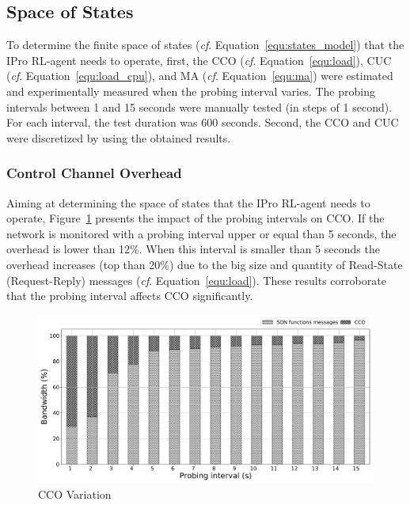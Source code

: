 \subsection{Space of States}
\label{subsec:space_states}

To determine the finite space of states (\textit{cf}. Equation~\ref{equ:states_model}) that the IPro RL-agent needs to operate, first, the CCO (\textit{cf}. Equation~\ref{equ:load}), CUC (\textit{cf}. Equation~\ref{equ:load_cpu}), and MA (\textit{cf}. Equation~\ref{equ:ma}) were estimated and experimentally measured when the probing interval varies. The probing intervals between 1 and 15 seconds were manually tested (in steps of 1 second). For each interval, the test duration was 600 seconds. Second, the CCO and CUC were discretized by using the obtained results.

\subsubsection{Control Channel Overhead}
Aiming at determining the space of states that the IPro RL-agent needs to operate, Figure~\ref{fig:control_channel_load_behavior} presents the impact of the probing intervals on CCO. If the network is monitored with a probing interval upper or equal than 5 seconds, the overhead is lower than 12\%. When this interval is smaller than 5 seconds the overhead increases (top than 20\%) due to the big size and quantity of Read-State (Request-Reply) messages (\textit{cf}. Equation~\ref{equ:load}). These results corroborate that the probing interval affects CCO significantly.

\begin{figure}[h!]
    \centering
    \includegraphics[width=1.0\textwidth]{figures/Fig7-control-channel-behavior}
    \caption{CCO Variation}
    \label{fig:control_channel_load_behavior}
\end{figure}

